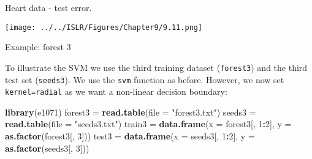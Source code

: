 \documentclass[10pt,ignorenonframetext,]{beamer}
\newenvironment{Shaded}{\begin{snugshade}}{\end{snugshade}}
\newcommand{\KeywordTok}[1]{\textcolor[rgb]{0.13,0.29,0.53}{\textbf{#1}}}
\newcommand{\DataTypeTok}[1]{\textcolor[rgb]{0.13,0.29,0.53}{#1}}
\newcommand{\DecValTok}[1]{\textcolor[rgb]{0.00,0.00,0.81}{#1}}
\newcommand{\StringTok}[1]{\textcolor[rgb]{0.31,0.60,0.02}{#1}}
\newcommand{\OperatorTok}[1]{\textcolor[rgb]{0.81,0.36,0.00}{\textbf{#1}}}
\newcommand{\NormalTok}[1]{#1}
\begin{document}
\begin{frame}

Heart data - test error.

\centering
\texttt{[image: ../../ISLR/Figures/Chapter9/9.11.png]}

\end{frame}

\begin{frame}[fragile]

\begin{block}{Example: forest 3}

\vspace{2mm}

To illustrate the SVM we use the third training dataset
(\texttt{forest3}) and the third test set (\texttt{seeds3}). We use the
\texttt{svm} function as before. However, we now set
\texttt{kernel=\textquotesingle{}radial\textquotesingle{}} as we want a
non-linear decision boundary:

\footnotesize

\begin{Shaded}
\begin{Highlighting}[]
\KeywordTok{library}\NormalTok{(e1071)}
\NormalTok{forest3 =}\StringTok{ }\KeywordTok{read.table}\NormalTok{(}\DataTypeTok{file =} \StringTok{"forest3.txt"}\NormalTok{)}
\NormalTok{seeds3 =}\StringTok{ }\KeywordTok{read.table}\NormalTok{(}\DataTypeTok{file =} \StringTok{"seeds3.txt"}\NormalTok{)}
\NormalTok{train3 =}\StringTok{ }\KeywordTok{data.frame}\NormalTok{(}\DataTypeTok{x =}\NormalTok{ forest3[, }\DecValTok{1}\OperatorTok{:}\DecValTok{2}\NormalTok{], }\DataTypeTok{y =} \KeywordTok{as.factor}\NormalTok{(forest3[, }\DecValTok{3}\NormalTok{]))}
\NormalTok{test3 =}\StringTok{ }\KeywordTok{data.frame}\NormalTok{(}\DataTypeTok{x =}\NormalTok{ seeds3[, }\DecValTok{1}\OperatorTok{:}\DecValTok{2}\NormalTok{], }\DataTypeTok{y =} \KeywordTok{as.factor}\NormalTok{(seeds3[, }\DecValTok{3}\NormalTok{]))}
\end{Highlighting}
\end{Shaded}

\end{block}

\end{frame}
\end{document}
